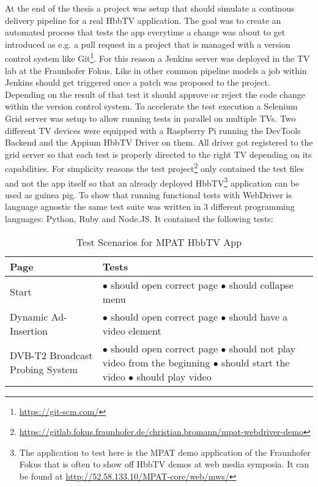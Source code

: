 At the end of the thesis a project was setup that should simulate a continous delivery pipeline for a real HbbTV application. The goal was to create an automated process that tests the app everytime a change was about to get introduced as e.g. a pull request in a project that is managed with a version control system like Git\footnote{\url{https://git-scm.com/}}. For this reason a Jenkins server was deployed in the TV lab at the Fraunhofer Fokus. Like in other common pipeline models a job within Jenkins should get triggered once a patch was proposed to the project. Depending on the result of that test it should approve or reject the code change within the version control system. To accelerate the test execution a Selenium Grid server was setup to allow running tests in parallel on multiple TVs. Two different TV devices were equipped with a Raspberry Pi running the DevTools Backend and the Appium HbbTV Driver on them. All driver got registered to the grid server so that each test is properly directed to the right TV depending on its capabilities. For simplicity reasons the test project\footnote{\url{https://gitlab.fokus.fraunhofer.de/christian.bromann/mpat-webdriver-demo}} only contained the test files and not the app itself so that an already deployed HbbTV\footnote{The application to test here is the MPAT demo application of the Fraunhofer Fokus that is often to show off HbbTV demos at web media symposia. It can be found at \url{http://52.58.133.10/MPAT-core/web/mws/}} application can be used as guinea pig. To show that running functional tests with WebDriver is language agnostic the same test suite was written in 3 different programming languages: Python, Ruby and Node.JS. It contained the following tests:

\noindent
\begin{table}[h!]
    \centering
    \begin{tabular}{|p{}|p{}|}
        \hline
        \textbf{Page} & \textbf{Tests} \\
        \hline
        Start &
        $\bullet$ should open correct page \newline
        $\bullet$ should collapse menu \vspace*{0.1cm} \\
        \hline
        Dynamic Ad-Insertion &
        $\bullet$ should open correct page \newline
        $\bullet$ should have a video element \\
        \hline
        DVB-T2 Broadcast Probing System &
        $\bullet$ should open correct page \newline
        $\bullet$ should not play video from the beginning \newline
        $\bullet$ should start the video \newline
        $\bullet$ should play video \\
        \hline
    \end{tabular}
    \caption{Test Scenarios for MPAT HbbTV App}
    \label{tab:table1}
\end{table}

